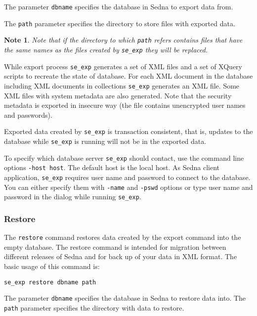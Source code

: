 \documentclass[a4paper,12pt]{article}
\newtheorem{note}{Note}
\begin{document}
The parameter \verb!dbname! specifies the database in Sedna to export data from. 

The \verb!path! parameter specifies the directory to store files with exported data. 

\begin{note}
Note that if the directory to which \verb!path! refers contains files that have the same names as the files created by \verb!se_exp! they will be replaced. 
\end{note}

While export process \verb!se_exp! generates a set of XML files and a set of XQuery scripts to 
recreate the state of database. For each XML document in the database including XML documents in
collections \verb!se_exp! generates an XML file. Some XML files with system metadata are also
generated. Note that the security metadata is exported in insecure way (the file contains 
unencrypted user names and passwords).

Exported data created by \verb!se_exp! is transaction consistent, that is, updates to the database 
while \verb!se_exp! is running will not be in the exported data. 

To specify which database server \verb!se_exp! should contact, use the command line options 
\verb!-host host!. The default host is the local host. As Sedna client application, \verb!se_exp! 
requires user name and password to connect to the database. You can either specify them with 
\verb!-name! and \verb!-pswd! options or type user name and password in the dialog while 
running \verb!se_exp!.




\subsubsection*{Restore}

The \verb!restore! command restores data created by the export command into the empty database.
The restore command is intended for migration between different releases of Sedna and for back
up of your data in XML format. The basic usage of this command is:

\begin{verbatim}
se_exp restore dbname path
\end{verbatim}  

The parameter \verb!dbname! specifies the database in Sedna to restore data into. The \verb!path!
parameter specifies the directory with data to restore. 
\end{document}
